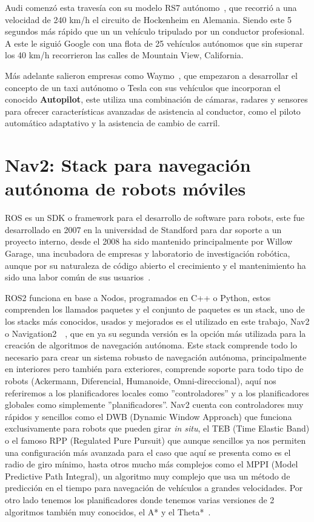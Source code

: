 Audi comenzó esta travesía con su modelo RS7 autónomo~\cite{audirs715}, que recorrió a una velocidad de 240 km/h el circuito de Hockenheim en Alemania. 
Siendo este 5 segundos más rápido que un un vehículo tripulado por un conductor profesional. A este le siguió Google con una flota de 25 
vehículos autónomos que sin superar los 40 km/h recorrieron las calles de Mountain View, California.

Más adelante salieron empresas como Waymo~\cite{waymo24}, que empezaron a desarrollar el concepto de un taxi autónomo o Tesla con sus vehículos que 
incorporan el conocido \textbf{Autopilot}, este utiliza una combinación de cámaras, radares y sensores para ofrecer características 
avanzadas de asistencia al conductor, como el piloto automático adaptativo y la asistencia de cambio de carril.

\section{Nav2: Stack para navegación autónoma de robots móviles}
ROS es un SDK o framework para el desarrollo de software para robots, este fue desarrollado en 2007 en la universidad de Standford para 
dar soporte a un proyecto interno, desde el 2008 ha sido mantenido principalmente por Willow Garage, una incubadora de empresas y 
laboratorio de investigación robótica, aunque por su naturaleza de código abierto el crecimiento y el mantenimiento ha sido una labor 
común de sus usuarios~\cite{ros2}.

ROS2 funciona en base a Nodos, programados en C++ o Python, estos comprenden los llamados paquetes y el conjunto de paquetes es un stack, 
uno de los stacks más conocidos, usados y mejorados es el utilizado en este trabajo, Nav2 o Navigation2~\cite{nav2}~, que en ya su segunda 
versión es la opción más utilizada para la creación de algoritmos de navegación autónoma.
Este stack comprende todo lo necesario para crear un sistema robusto de navegación autónoma, principalmente en interiores pero también para exteriores,
comprende soporte para todo tipo de robots (Ackermann, Diferencial, Humanoide, Omni-direccional), aquí nos referiremos a los planificadores locales
como ''controladores'' y a los planificadores globales como simplemente ''planificadores''. Nav2 cuenta con controladores muy rápidos y 
sencillos como el DWB (Dynamic Window Approach) que funciona exclusivamente para robots que pueden girar \textit{in situ}, el TEB 
(Time Elastic Band) o el famoso RPP (Regulated Pure Pursuit) que aunque sencillos ya nos permiten una configuración más avanzada
para el caso que aquí se presenta como es el radio de giro mínimo, hasta otros mucho más complejos como el MPPI (Model Predictive Path Integral), un algoritmo 
muy complejo que usa un método de predicción en el tiempo para navegación de vehículos a grandes velocidades. Por otro lado tenemos los 
planificadores donde tenemos varias versiones de 2 algoritmos también muy conocidos, el A* y el Theta*~\cite{sun2023path}.

